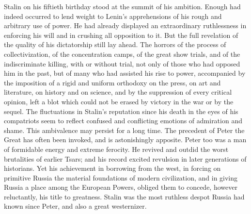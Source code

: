 Stalin on his fiftieth birthday stood at the summit of his ambition. Enough had indeed occurred to lend weight to Lenin's apprehensions of his rough and arbitrary use of power. He had already displayed an extraordinary ruthlessness in enforcing his will and in crushing all opposition to it. But the full revelation of the quality of his dictatorship still lay ahead. The horrors of the process of collectivization, of the concentration camps, of the great show trials, and of the indiscriminate killing, with or without trial, not only of those who had opposed him in the past, but of many who had assisted his rise to power, accompanied by the imposition of a rigid and uniform orthodoxy on the press, on art and literature, on history and on science, and by the suppression of every critical opinion, left a blot which could not be erased by victory in the war or by the sequel. The fluctuations in Stalin's reputation since his death in the eyes of his compatriots seem to reflect confused and conflicting emotions of admiration and shame. This ambivalence may persist for a long time. The precedent of Peter the Great has often been invoked, and is astonishingly apposite. Peter too was a man of formidable energy and extreme ferocity. He revived and outdid the worst brutalities of earlier Tsars; and his record excited revulsion in later generations of historians. Yet his achievement in borrowing from the west, in forcing on primitive Russia the material foundations of modern civilization, and in giving Russia a place among the European Powers, obliged them to concede, however reluctantly, his title to greatness. Stalin was the most ruthless despot Russia had known since Peter, and also a great westernizer. 
